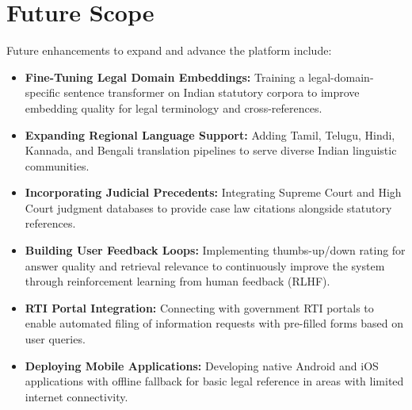 \documentclass[12pt,a4paper]{report}
\begin{document}
\section{Future Scope}
Future enhancements to expand and advance the platform include:
\begin{itemize}
    \item \textbf{Fine-Tuning Legal Domain Embeddings:} Training a legal-domain-specific sentence transformer on Indian statutory corpora to improve embedding quality for legal terminology and cross-references.
    \item \textbf{Expanding Regional Language Support:} Adding Tamil, Telugu, Hindi, Kannada, and Bengali translation pipelines to serve diverse Indian linguistic communities.
    \item \textbf{Incorporating Judicial Precedents:} Integrating Supreme Court and High Court judgment databases to provide case law citations alongside statutory references.
    \item \textbf{Building User Feedback Loops:} Implementing thumbs-up/down rating for answer quality and retrieval relevance to continuously improve the system through reinforcement learning from human feedback (RLHF).
    \item \textbf{RTI Portal Integration:} Connecting with government RTI portals to enable automated filing of information requests with pre-filled forms based on user queries.
    \item \textbf{Deploying Mobile Applications:} Developing native Android and iOS applications with offline fallback for basic legal reference in areas with limited internet connectivity.
\end{itemize}
\end{document}

